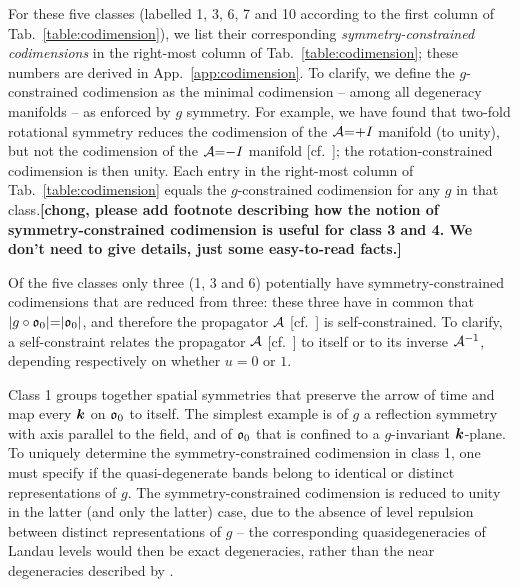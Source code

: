 \documentclass[aps, prb, showpacs, twocolumn, notitlepage, superscriptaddress]{revtex4-1}
\begin{document}
For these five classes (labelled 1, 3, 6, 7 and 10 according to the first column of Tab.\ \ref{table:codimension}), we list their corresponding \textit{symmetry-constrained codimensions} in the right-most column of Tab.\ \ref{table:codimension}; these numbers are derived in  App.\ \ref{app:codimension}. To clarify, we define the $g$-constrained codimension as the minimal codimension -- among all degeneracy manifolds -- as enforced by $g$ symmetry. For example, we have found that two-fold rotational symmetry reduces the codimension of the ${\cal A}{=}{+}I$ manifold (to unity), but not the codimension of the ${\cal A}{=}{-}I$ manifold [cf.\ ]; the rotation-constrained codimension is then unity. Each entry in the right-most column of Tab.\ \ref{table:codimension} equals the $g$-constrained codimension for any $g$ in that class.\textbf{[chong, please add footnote describing how the notion of symmetry-constrained codimension is useful for class 3 and 4. We don't need to give details, just some easy-to-read facts.]}

Of the five classes only three (1, 3 and 6) potentially have symmetry-constrained codimensions that are reduced from three: these three have in common that  $|g\circ\mathfrak{o}_0|{=}|\mathfrak{o}_0|$, and therefore the propagator ${\cal A}$ [cf.\ ] is self-constrained. To clarify, a self-constraint relates  the propagator ${\cal A}$ [cf.\ ] to itself or to its inverse ${\cal A}^{-1}$, depending respectively on whether $u{=}0$ or $1$.  


Class 1 groups together  spatial symmetries that preserve the arrow of time and map every $\boldsymbol{k}$ on $\mathfrak{o}_0$ to itself. The simplest example is of $g$  a reflection symmetry with axis parallel to the field, and of  $\mathfrak{o}_0$ that is confined to a $g$-invariant $\boldsymbol{k}$-plane. To uniquely determine the symmetry-constrained codimension in class 1, one must specify if the quasi-degenerate bands belong to identical or distinct representations of $g$.  The symmetry-constrained codimension is reduced to unity in the latter (and only the latter) case, due to the absence of level repulsion between distinct representations of $g$ -- the corresponding quasidegeneracies of Landau levels would then be exact degeneracies, rather than the near degeneracies described by .   
\end{document}
